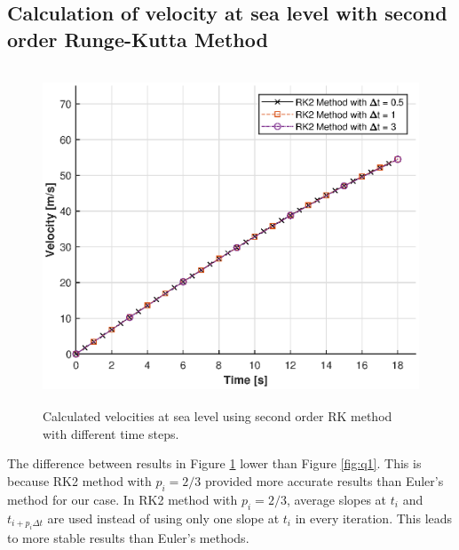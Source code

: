 \documentclass[letterpaper,12pt]{article}
\begin{document}
\subsection{Calculation of velocity at sea level with second order Runge-Kutta Method }
\begin{figure}[ht]
        \centering \includegraphics[max height=10cm]{graphs/RK2.eps}
        \caption{Calculated velocities at sea level using second order RK method with different time steps.}
        \label{fig:rk2}
\end{figure}
The difference between results in Figure \ref{fig:rk2} lower than Figure \ref{fig:q1}. This is because RK2 method with $p_i=2/3$
provided more accurate results than Euler's method for our case. In RK2 method with $p_i=2/3$, average slopes at $t_i$ and $t_{i+p_i\Delta t}$
are used instead of using only one slope at $ t_i $ in every iteration. This leads to more stable results than Euler's methods.
\newpage
\end{document}
